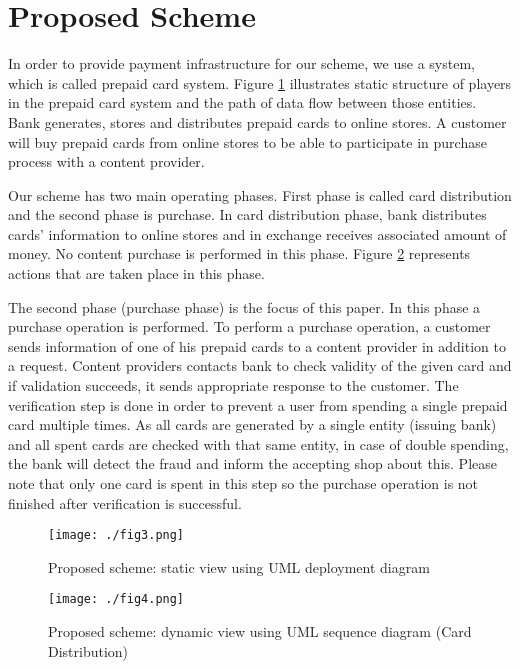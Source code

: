 \documentclass[times]{secauth}
\begin{document}
\section{Proposed Scheme}
\label{sec:proposed_scheme}
In order to provide payment infrastructure for our scheme, we use a system, which is called prepaid card system. Figure \ref{fig_static} illustrates static structure of players in the prepaid card system and the path of data flow between those entities. Bank generates, stores and distributes prepaid cards to online stores. A customer will buy prepaid cards from online stores to be able to participate in purchase process with a content provider. 

Our scheme has two main operating phases. First phase is called card distribution and the second phase is purchase. In card distribution phase, bank distributes cards' information to online stores and in exchange receives associated amount of money. No content purchase is performed in this phase. Figure \ref{fig_dynamic_card} represents actions that are taken place in this phase.

The second phase (purchase phase) is the focus of this paper. In this phase a purchase operation is performed. To perform a purchase operation, a customer sends information of one of his prepaid cards to a content provider in addition to a request. Content providers contacts bank to check validity of  the given card and if validation succeeds, it sends appropriate response to the customer. The verification step is done in order to prevent a user from spending a single prepaid card multiple times. As all cards are generated by a single entity (issuing bank) and all spent cards are checked with that same entity, in case of double spending, the bank will detect the fraud and inform the accepting shop about this. Please note that only one card is spent in this step so the purchase operation is not finished after verification is successful.

\begin{figure}
\centering
\texttt{[image: ./fig3.png]}
\caption{Proposed scheme: static view using UML deployment diagram}
\label{fig_static}
\end{figure}

\begin{figure}
\centering
\texttt{[image: ./fig4.png]}
\caption{Proposed scheme: dynamic view using UML sequence diagram (Card Distribution)}
\label{fig_dynamic_card}
\end{figure}
\end{document}
